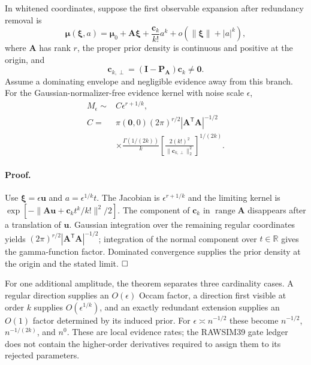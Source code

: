 \begin{theorem}
In whitened coordinates, suppose the first observable expansion after
redundancy removal is
\begin{equation}
 \bm\mu(\bm\xi,a)=\bm\mu_0+\bm A\bm\xi
 +\frac{\bm c_k}{k!}a^k
 +o(\|\bm\xi\|+|a|^k),
 \label{eq:supp-mixed-singular-map}
\end{equation}
where $\bm A$ has rank $r$, the proper prior density is continuous and positive
at the origin, and
\begin{equation}
 \bm c_{k,\perp}=(\bm I-\bm P_{\bm A})\bm c_k\ne\bm0.
 \label{eq:supp-normal-higher-order-coefficient}
\end{equation}
Assume a dominating envelope and negligible evidence away from this branch.
For the Gaussian-normalizer-free evidence kernel with noise scale $\epsilon$,
\begin{align}
 M_\epsilon\sim{}&C\epsilon^{r+1/k},
 \label{eq:supp-mixed-singular-evidence-rate}\\
 C={}&\pi(\bm0,0)(2\pi)^{r/2}
 |\bm A^{\mathsf T}\bm A|^{-1/2}\\
 &\times
 \frac{\Gamma(1/(2k))}{k}
 \left[\frac{2(k!)^2}{\|\bm c_{k,\perp}\|_2^2}
 \right]^{1/(2k)}.
 \label{eq:supp-mixed-singular-evidence-constant}
\end{align}
\label{thm:supp-mixed-singular-evidence}
\end{theorem}

\paragraph{Proof.}
Use $\bm\xi=\epsilon\bm u$ and
$a=\epsilon^{1/k}t$. The Jacobian is
$\epsilon^{r+1/k}$ and the limiting kernel is
$\exp[-\|\bm A\bm u+\bm c_kt^k/k!\|^2/2]$.
The component of $\bm c_k$ in $\operatorname{range}\bm A$ disappears after a
translation of $\bm u$. Gaussian integration over the remaining regular
coordinates yields $(2\pi)^{r/2}|\bm A^{\mathsf T}\bm A|^{-1/2}$; integration
of the normal component over $t\in\mathbb R$ gives the gamma-function factor.
Dominated convergence supplies the prior density at the origin and the stated
limit. $\hfill\square$

For one additional amplitude, the theorem separates three cardinality cases.
A regular direction supplies an $O(\epsilon)$ Occam factor, a direction first
visible at order $k$ supplies $O(\epsilon^{1/k})$, and an exactly redundant
extension supplies an $O(1)$ factor determined by its induced prior. For
$\epsilon\asymp n^{-1/2}$ these become $n^{-1/2}$,
$n^{-1/(2k)}$, and $n^0$. These are local evidence rates; the RAWSIM39 gate
ledger does not contain the higher-order derivatives required to assign them
to its rejected parameters.

